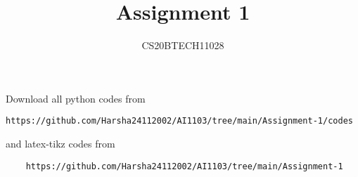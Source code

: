 \documentclass[journal,12pt,twocolumn]{IEEEtran}
\DeclareMathOperator*{\Res}{Res}
\begin{document}
\newcommand{\BEQA}{\begin{eqnarray}}
\newcommand{\EEQA}{\end{eqnarray}}
\newcommand{\define}{\stackrel{\triangle}{=}}

\raggedbottom
\setlength{\parindent}{0pt}
\providecommand{\mbf}{\mathbf}
\providecommand{\pr}[1]{\ensuremath{\Pr\left(#1\right)}}
\providecommand{\qfunc}[1]{\ensuremath{Q\left(#1\right)}}
\providecommand{\sbrak}[1]{\ensuremath{{}\left[#1\right]}}
\providecommand{\lsbrak}[1]{\ensuremath{{}\left[#1\right.}}
\providecommand{\rsbrak}[1]{\ensuremath{{}\left.#1\right]}}
\providecommand{\brak}[1]{\ensuremath{\left(#1\right)}}
\providecommand{\lbrak}[1]{\ensuremath{\left(#1\right.}}
\providecommand{\rbrak}[1]{\ensuremath{\left.#1\right)}}
\providecommand{\cbrak}[1]{\ensuremath{\left\{#1\right\}}}
\providecommand{\lcbrak}[1]{\ensuremath{\left\{#1\right.}}
\providecommand{\rcbrak}[1]{\ensuremath{\left.#1\right\}}}
\theoremstyle{remark}
\newtheorem{rem}{Remark}
\newcommand{\sgn}{\mathop{\mathrm{sgn}}}
\providecommand{\abs}[1]{\vert#1\vert}
\providecommand{\res}[1]{\Res\displaylimits_{#1}} 
\providecommand{\norm}[1]{\lVert#1\rVert}
\providecommand{\mtx}[1]{\mathbf{#1}}
\providecommand{\mean}[1]{E[ #1 ]}
\providecommand{\fourier}{\overset{\mathcal{F}}{ \rightleftharpoons}}
\providecommand{\system}{\overset{\mathcal{H}}{ \longleftrightarrow}}
\newcommand{\solution}{\noindent \textbf{Solution: }}
\newcommand{\cosec}{\,\text{cosec}\,}
\providecommand{\dec}[2]{\ensuremath{\overset{#1}{\underset{#2}{\gtrless}}}}
\newcommand{\myvec}[1]{\ensuremath{\begin{pmatrix}#1\end{pmatrix}}}
\newcommand{\mydet}[1]{\ensuremath{\begin{vmatrix}#1\end{vmatrix}}}
\makeatletter
{}
\makeatother
\let\StandardTheFigure\thefigure
\let\vec\mathbf
\renewcommand{\thefigure}{\theproblem}
\def\putbox#1#2#3{\makebox[0in][l]{\makebox[#1][l]{}\raisebox{\baselineskip}[0in][0in]{\raisebox{#2}[0in][0in]{#3}}}}
     \def\rightbox#1{\makebox[0in][r]{#1}}
     \def\centbox#1{\makebox[0in]{#1}}
     \def\topbox#1{\raisebox{-\baselineskip}[0in][0in]{#1}}
     \def\midbox#1{\raisebox{-0.5\baselineskip}[0in][0in]{#1}}
\vspace{3cm}
\title{Assignment 1}
\author{CS20BTECH11028}
\maketitle
\newpage
\bigskip
\renewcommand{\thefigure}{\theenumi}
\renewcommand{\thetable}{\theenumi}
Download all python codes from 
\begin{lstlisting}
https://github.com/Harsha24112002/AI1103/tree/main/Assignment-1/codes
\end{lstlisting}
%
and latex-tikz codes from 
%
\begin{lstlisting}
    https://github.com/Harsha24112002/AI1103/tree/main/Assignment-1
\end{lstlisting}
\end{document}
